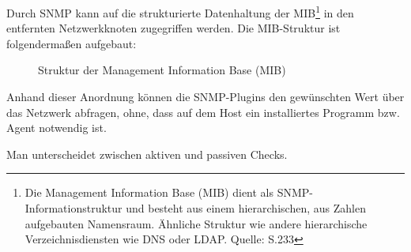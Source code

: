 Durch SNMP kann auf die strukturierte Datenhaltung der MIB\footnote{Die Management Information Base (\gls{MIB}) dient als SNMP-Informationstruktur und besteht aus einem hierarchischen, aus Zahlen aufgebauten Namensraum. Ähnliche Struktur wie andere hierarchische Verzeichnisdiensten wie \gls{DNS} oder \gls{LDAP}. Quelle: \cite{Barth08} S.233} in den entfernten Netzwerkknoten zugegriffen werden.
Die MIB-Struktur ist folgendermaßen aufgebaut:

\begin{figure}[ht]
	\centering
		\caption[Struktur der Management Information Base (MIB)]{Struktur der Management Information Base (MIB)\protect\footnotemark}
		\label{munin-mib}
\end{figure}
Anhand dieser Anordnung können die SNMP-Plugins den gewünschten Wert über das Netzwerk abfragen, ohne, dass auf dem Host ein installiertes Programm bzw. Agent notwendig ist.




Man unterscheidet zwischen aktiven und passiven Checks.
